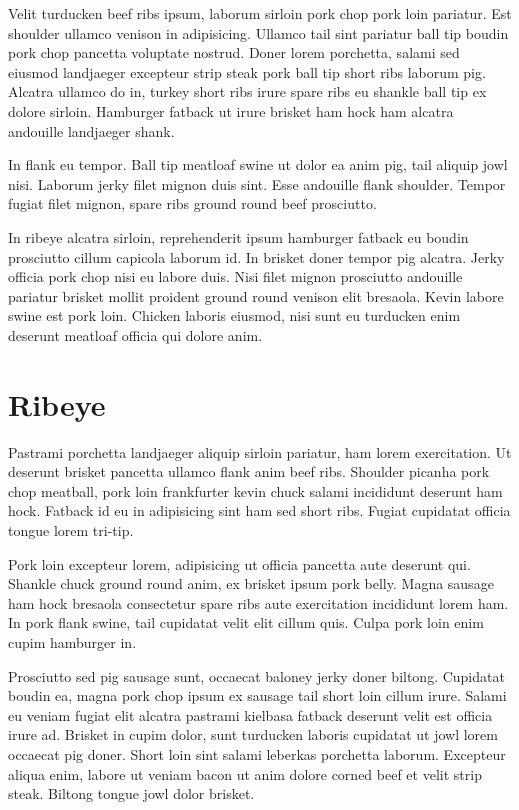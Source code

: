 \documentclass[a4paper,10pt]{article}
\begin{document}
Velit turducken beef ribs ipsum, laborum sirloin pork chop pork loin pariatur. Est shoulder ullamco venison in adipisicing. Ullamco tail sint pariatur ball tip boudin pork chop pancetta voluptate nostrud. Doner lorem porchetta, salami sed eiusmod landjaeger excepteur strip steak pork ball tip short ribs laborum pig. Alcatra ullamco do in, turkey short ribs irure spare ribs eu shankle ball tip ex dolore sirloin. Hamburger fatback ut irure brisket ham hock ham alcatra andouille landjaeger shank.

In flank eu tempor. Ball tip meatloaf swine ut dolor ea anim pig, tail aliquip jowl nisi. Laborum jerky filet mignon duis sint. Esse andouille flank shoulder. Tempor fugiat filet mignon, spare ribs ground round beef prosciutto.

In ribeye alcatra sirloin, reprehenderit ipsum hamburger fatback eu boudin prosciutto cillum capicola laborum id. In brisket doner tempor pig alcatra. Jerky officia pork chop nisi eu labore duis. Nisi filet mignon prosciutto andouille pariatur brisket mollit proident ground round venison elit bresaola. Kevin labore swine est pork loin. Chicken laboris eiusmod, nisi sunt eu turducken enim deserunt meatloaf officia qui dolore anim.

\section{Ribeye}

Pastrami porchetta landjaeger aliquip sirloin pariatur, ham lorem exercitation. Ut deserunt brisket pancetta ullamco flank anim beef ribs. Shoulder picanha pork chop meatball, pork loin frankfurter kevin chuck salami incididunt deserunt ham hock. Fatback id eu in adipisicing sint ham sed short ribs. Fugiat cupidatat officia tongue lorem tri-tip.

Pork loin excepteur lorem, adipisicing ut officia pancetta aute deserunt qui. Shankle chuck ground round anim, ex brisket ipsum pork belly. Magna sausage ham hock bresaola consectetur spare ribs aute exercitation incididunt lorem ham. In pork flank swine, tail cupidatat velit elit cillum quis. Culpa pork loin enim cupim hamburger in.

Prosciutto sed pig sausage sunt, occaecat baloney jerky doner biltong. Cupidatat boudin ea, magna pork chop ipsum ex sausage tail short loin cillum irure. Salami eu veniam fugiat elit alcatra pastrami kielbasa fatback deserunt velit est officia irure ad. Brisket in cupim dolor, sunt turducken laboris cupidatat ut jowl lorem occaecat pig doner. Short loin sint salami leberkas porchetta laborum. Excepteur aliqua enim, labore ut veniam bacon ut anim dolore corned beef et velit strip steak. Biltong tongue jowl dolor brisket.
\end{document}
